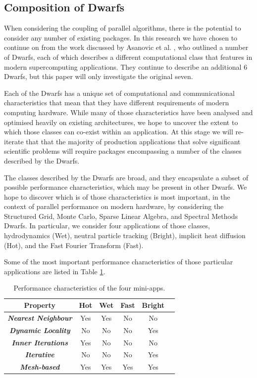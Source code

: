 \documentclass[runningheads,a4paper]{llncs}
\begin{document}
\subsection{Composition of Dwarfs}

When considering the coupling of parallel algorithms, there is the potential to consider any number of existing packages. In this research we have chosen to continue on from the work discussed by Asanovic et al. \cite{Asanovic2006}, who outlined a number of Dwarfs, each of which describes a different computational class that features in modern supercomputing applications. They continue to describe an additional 6 Dwarfs, but this paper will only investigate the original seven.

Each of the Dwarfs has a unique set of computational and communicational characteristics that mean that they have different requirements of modern computing hardware. While many of those characteristics have been analysed and optimised heavily on existing architectures, we hope to uncover the extent to which those classes can co-exist within an application. At this stage we will re-iterate that that the majority of production applications that solve significant scientific problems will require packages encompassing a number of the classes described by the Dwarfs.

The classes described by the Dwarfs are broad, and they encapsulate a subset of possible performance characteristics, which may be present in other Dwarfs. We hope to discover which is of those characteristics is most important, in the context of parallel performance on modern hardware, by considering the Structured Grid, Monte Carlo, Sparse Linear Algebra, and Spectral Methods Dwarfs. In particular, we consider four applications of those classes, hydrodynamics (Wet), neutral particle tracking (Bright), implicit heat diffusion (Hot), and the Fast Fourier Transform (Fast).

Some of the most important performance characteristics of those particular applications are listed in Table \ref{tab:perf-char-mini-apps}.

\begin{table}[h]
  \begin{center}
    \begin{tabular}{cccccc}
      \hline
      \textbf{Property} & \textbf{Hot} & \textbf{Wet} & \textbf{Fast} & \textbf{Bright} \\
      \hline
      \textit{\textbf{Nearest Neighbour}} & Yes & Yes & No & No \\
      \textit{\textbf{Dynamic Locality}} & No & No & No & Yes \\
      \textit{\textbf{Inner Iterations}} & Yes & No & No & No \\
      \textit{\textbf{Iterative}} & No & No & No & Yes \\
      \textit{\textbf{Mesh-based}} & Yes & Yes & Yes & Yes \\
    \end{tabular}
  \end{center}
  \caption{Performance characteristics of the four mini-apps.}
  \label{tab:perf-char-mini-apps}
\end{table}
\end{document}
